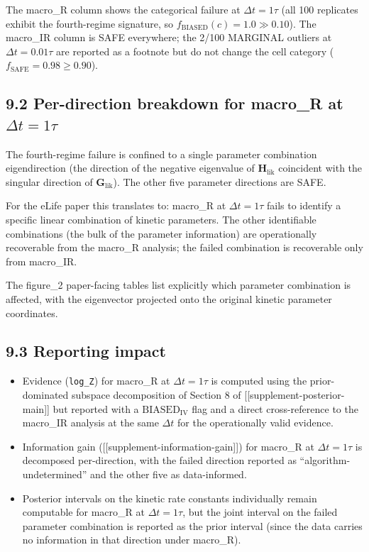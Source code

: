 \documentclass[11pt]{article}
\begin{document}
The macro\_R column shows the categorical failure at $\Delta t = 1\tau$
(all 100 replicates exhibit the fourth-regime signature, so
$f_{\mathrm{BIASED}}(c) = 1.0 \gg 0.10$). The macro\_IR column is
SAFE everywhere; the 2/100 MARGINAL outliers at $\Delta t = 0.01\tau$
are reported as a footnote but do not change the cell category
($f_{\mathrm{SAFE}} = 0.98 \geq 0.90$).

\subsection*{9.2 Per-direction breakdown for macro\_R at $\Delta t = 1\tau$}

The fourth-regime failure is confined to a single parameter
combination eigendirection (the direction of the negative eigenvalue
of $\mathbf H_{\mathrm{lik}}$ coincident with the singular direction
of $\mathbf G_{\mathrm{lik}}$). The other five parameter directions
are SAFE.

For the eLife paper this translates to: macro\_R at $\Delta t = 1\tau$
fails to identify a specific linear combination of kinetic parameters.
The other identifiable combinations (the bulk of the parameter
information) are operationally recoverable from the macro\_R analysis;
the failed combination is recoverable only from macro\_IR.

The figure\_2 paper-facing tables list explicitly which parameter
combination is affected, with the eigenvector projected onto the
original kinetic parameter coordinates.

\subsection*{9.3 Reporting impact}

\begin{itemize}
\item Evidence (\texttt{log\_Z}) for macro\_R at $\Delta t = 1\tau$ is
  computed using the prior-dominated subspace decomposition of
  Section 8 of [[supplement-posterior-main]] but reported with a
  $\mathrm{BIASED}_{\mathrm{IV}}$ flag and a direct cross-reference
  to the macro\_IR analysis at the same $\Delta t$ for the operationally
  valid evidence.
\item Information gain ([[supplement-information-gain]]) for macro\_R
  at $\Delta t = 1\tau$ is decomposed per-direction, with the failed
  direction reported as ``algorithm-undetermined'' and the other
  five as data-informed.
\item Posterior intervals on the kinetic rate constants individually
  remain computable for macro\_R at $\Delta t = 1\tau$, but the
  joint interval on the failed parameter combination is reported as
  the prior interval (since the data carries no information in that
  direction under macro\_R).
\end{itemize}
\end{document}
